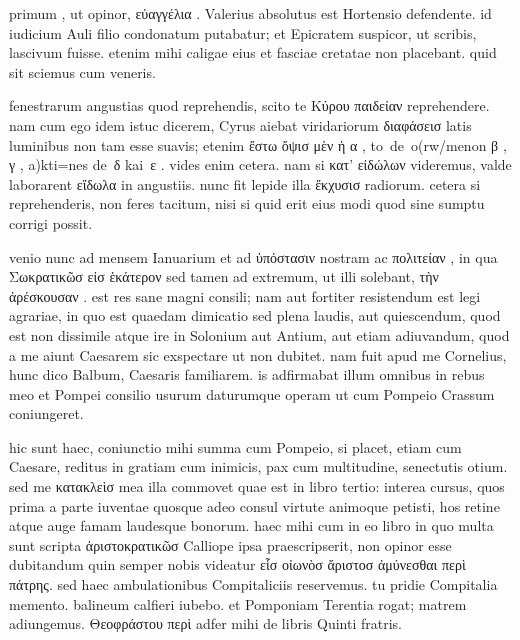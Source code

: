 


 primum , ut opinor, εὐαγγέλια . Valerius absolutus est Hortensio defendente. id iudicium Auli filio condonatum putabatur; et Epicratem suspicor, ut scribis, lascivum fuisse. etenim mihi caligae eius et fasciae cretatae non placebant. quid sit sciemus cum veneris.

 fenestrarum angustias quod reprehendis, scito te Κύρου παιδείαν reprehendere. nam cum ego idem istuc dicerem, Cyrus aiebat viridariorum διαφάσεισ latis luminibus non tam esse suavis; etenim ἔστω ὄψισ μὲν ἡ α , to\ de\ o(rw/menon β , γ , a)kti=nes de\ δ kai\ ε . vides enim cetera. nam si κατ' εἰδώλων videremus, valde laborarent εἴδωλα in angustiis. nunc fit lepide illa ἔκχυσισ radiorum. cetera si reprehenderis, non feres tacitum, nisi si quid erit eius modi quod sine sumptu corrigi possit.

 venio nunc ad mensem Ianuarium et ad ὑπόστασιν nostram ac πολιτείαν , in qua Σωκρατικῶσ εἰσ ἑκάτερον sed tamen ad extremum, ut illi solebant, τὴν ἀρέσκουσαν . est res sane magni consili; nam aut fortiter resistendum est legi agrariae, in quo est quaedam dimicatio sed plena laudis, aut quiescendum, quod est non dissimile atque ire in Solonium aut Antium, aut etiam adiuvandum, quod a me aiunt Caesarem sic exspectare ut non dubitet. nam fuit apud me Cornelius, hunc dico Balbum, Caesaris familiarem. is adfirmabat illum omnibus in rebus meo et Pompei consilio usurum daturumque operam ut cum Pompeio Crassum coniungeret.

 hic sunt haec, coniunctio mihi summa cum Pompeio, si placet, etiam cum Caesare, reditus in gratiam cum inimicis, pax cum multitudine, senectutis otium. sed me κατακλεὶσ mea illa commovet quae est in libro tertio: interea cursus, quos prima a parte iuventae quosque adeo consul virtute animoque petisti, hos retine atque auge famam laudesque bonorum. haec mihi cum in eo libro in quo multa sunt scripta ἀριστοκρατικῶσ Calliope ipsa praescripserit, non opinor esse dubitandum quin semper nobis videatur εἷσ οἰωνὸσ ἄριστοσ ἀμύνεσθαι περὶ πάτρης. sed haec ambulationibus Compitaliciis reservemus. tu pridie Compitalia memento. balineum calfieri iubebo. et Pomponiam Terentia rogat; matrem adiungemus. Θεοφράστου περὶ adfer mihi de libris Quinti fratris.
